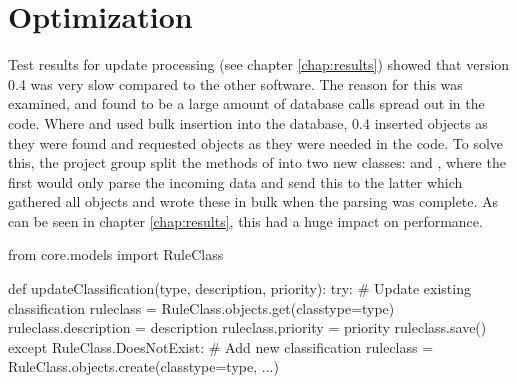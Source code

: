 \section{Optimization}
Test results for update processing (see chapter \ref{chap:results}) showed that
\snowman{} version 0.4 was very slow compared to the other software. The reason
for this was examined, and found to be a large amount of database calls spread
out in the code. Where \bhtb{} and \snortmanager{} used bulk insertion into the
database, \snowman{} 0.4 inserted objects as they were found and requested
objects as they were needed in the code. To solve this, the project group split
the methods of  into two new classes: 
and , where the first would only parse the incoming data
and send this to the latter which gathered all objects and wrote these in bulk
when the parsing was complete. As can be seen in chapter \ref{chap:results},
this had a huge impact on performance.

\begin{python}[caption=Updating a classification in \snowman{} 0.4]
from core.models import RuleClass

def updateClassification(type, description, priority):
  try:
    # Update existing classification
    ruleclass = RuleClass.objects.get(classtype=type)
    ruleclass.description = description
    ruleclass.priority = priority
    ruleclass.save()
  except RuleClass.DoesNotExist:
    # Add new classification
    ruleclass = RuleClass.objects.create(classtype=type, ...)
\end{python}